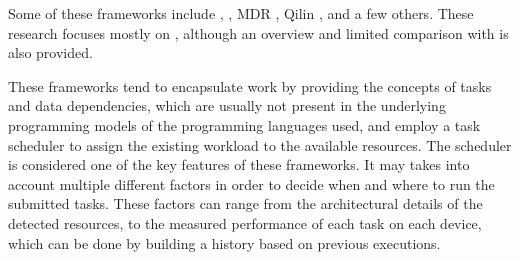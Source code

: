 \documentclass[main.tex]{subfiles}
\begin{document}
Some of these frameworks include \gama \cite{joao2012gama}, \starpu \cite{augonnet2011starpu}, MDR \cite{linderman2008merge}, Qilin \cite{luk2009qilin}, and a few others. These research focuses mostly on \starpu, although an overview and limited comparison with \gama is also provided.

These frameworks tend to encapsulate work by providing the concepts of tasks and data dependencies, which are usually not present in the underlying programming models of the programming languages used, and employ a task scheduler to assign the existing workload to the available resources.
The scheduler is considered one of the key features of these  frameworks. It may takes into account multiple different factors in order to decide when and where to run the submitted tasks. These factors can range from the architectural details of the detected resources, to the measured performance of each task on each device, which can be done by building a history based on previous executions.



\end{document}
